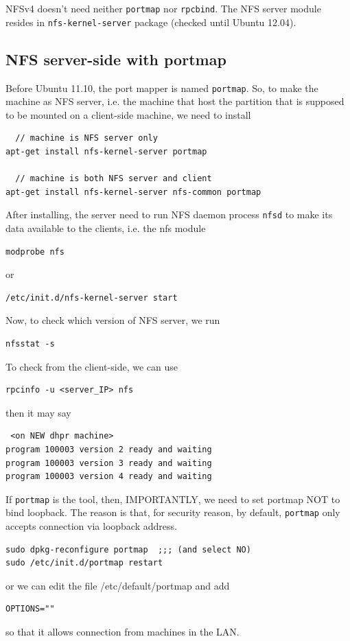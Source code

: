 NFSv4 doesn't need neither \verb!portmap! nor \verb!rpcbind!. The NFS server
module resides in \verb!nfs-kernel-server! package (checked until Ubuntu 12.04).

\subsection{NFS server-side with portmap}
\label{sec:NFS_portmap}

Before Ubuntu 11.10, the port mapper is named \verb!portmap!. So, to make the
machine as NFS server, i.e. the machine that host the partition that is
supposed to be mounted on a client-side machine, we need to install

\begin{verbatim}
  // machine is NFS server only
apt-get install nfs-kernel-server portmap 

  // machine is both NFS server and client
apt-get install nfs-kernel-server nfs-common portmap 
\end{verbatim}

After installing, the server need to run NFS daemon process \verb!nfsd! to make its data
available to the clients, i.e. the nfs module
\begin{verbatim}	
modprobe nfs
\end{verbatim}
or 
\begin{verbatim}
/etc/init.d/nfs-kernel-server start
\end{verbatim}

Now, to check which version of NFS server, we run
\begin{verbatim}
nfsstat -s
\end{verbatim}
To check from the client-side, we can use
\begin{verbatim}
rpcinfo -u <server_IP> nfs
\end{verbatim}
then it may say
\begin{verbatim} <on NEW dhpr machine>
program 100003 version 2 ready and waiting
program 100003 version 3 ready and waiting
program 100003 version 4 ready and waiting
\end{verbatim}

If \verb!portmap! is the tool, then, IMPORTANTLY, we need to set portmap
NOT to bind loopback. The reason is that, for security reason, by default,
\verb!portmap! only accepts connection via loopback address.
\begin{verbatim}
sudo dpkg-reconfigure portmap  ;;; (and select NO)
sudo /etc/init.d/portmap restart
\end{verbatim}
or we can edit the file /etc/default/portmap and add
\begin{verbatim}
OPTIONS=""
\end{verbatim}
so that it allows connection from machines in the LAN.

